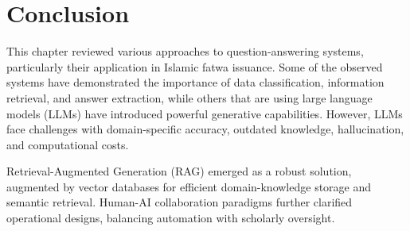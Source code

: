 \section{Conclusion}

This chapter reviewed various approaches to question-answering systems, particularly their application in Islamic fatwa issuance. Some of the observed systems have demonstrated the importance of data classification, information retrieval, and answer extraction, while others that are using large language models (LLMs) have introduced powerful generative capabilities. However, LLMs face challenges with domain-specific accuracy, outdated knowledge, hallucination, and computational costs.

Retrieval-Augmented Generation (RAG) emerged as a robust solution, augmented by vector databases for efficient domain-knowledge storage and semantic retrieval. Human-AI collaboration paradigms further clarified operational designs, balancing automation with scholarly oversight. 










